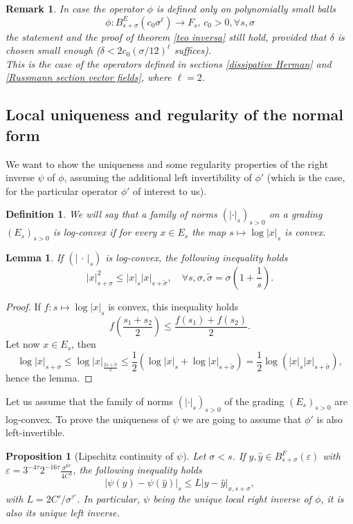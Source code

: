 \documentclass[oneside, 11pt]{amsbook}
\newcommand{\pa}[1]{{\left(#1\right)}}
\newcommand{\abs}[1]{{\left|#1\right|}}
\newcommand{\eps}{\varepsilon}
\newcommand{\0}{{(0)}}
\newcommand{\3}{{(3)}}
\newtheorem{prop}{Proposition}[section]
\newtheorem{rmk}{Remark}[section]
\newtheorem{defn}{Definition}
\newtheorem{lemma}{Lemma}
\numberwithin{equation}{section}
\numberwithin{defn}{section}
\numberwithin{prop}{section}
\numberwithin{cor}{section}
\numberwithin{lemma}{section}
\numberwithin{rmk}{section}
\numberwithin{corollary}{section}
\begin{document}
\begin{rmk}
In case the operator $\phi$ is defined only on polynomially small balls $$\phi: B^E_{s+\sigma}(c_0 \sigma^{\ell})\to F_s,\, c_0>0, \forall s,\sigma$$ the statement and the proof of theorem \ref{teo inversa} still hold, provided that $\delta$ is chosen small enough ($\delta< 2c_0(\sigma/12)^{\ell}$ suffices). \\ This is the case of the operators defined in sections \ref{dissipative Herman} and \ref{Russmann section vector fields}, where $\ell=2$. 
\label{remark polynomial}
\end{rmk}
\subsection{Local uniqueness and regularity of the normal form}
We want to show the uniqueness and some regularity properties of the right inverse $\psi$ of $\phi$, assuming the additional left invertibility of $\phi'$ (which is the case, for the particular operator $\phi'$ of interest to us).
\begin{defn}
We will say that a family of norms $(\abs{\cdot}_s)_{s>0}$ on a grading $(E_s)_{s>0}$ is \emph{log-convex} if for every $x\in E_s$ the map $ s\mapsto \log\abs{x}_s $ is convex.
\end{defn}

\begin{lemma} If $(\abs{\,\cdot\,}_s)$ is log-convex, the following inequality holds \[\abs{x}^2_{s+\sigma}\leq \abs{x}_s \abs{x}_{s+\tilde{\sigma}},\quad \forall s,\sigma,\tilde{\sigma}=\sigma(1+\frac{1}{s}).\] 
\end{lemma}

\begin{proof}
If $f: s\mapsto \log\abs{x}_s$ is convex, this inequality holds \[f\pa{\frac{s_1 + s_2}{2}}\leq \frac{f(s_1) + f(s_2)}{2}.\] Let now $x\in E_s$, then
\[\log\abs{x}_{s+\sigma}\leq\log\abs{x}_{\frac{2s + \tilde{\sigma}}{2}}\leq \frac{1}{2}\pa{\log\abs{x}_s + \log\abs{x}_{s+\tilde{\sigma}}}=\frac{1}{2}\log(\abs{x}_s\abs{x}_{s+\tilde{\sigma}}),\]hence the lemma. 
\end{proof}
Let us assume that the family of norms $(\abs{\cdot}_s)_{s>0}$ of the grading $(E_s)_{s>0}$ are log-convex. To prove the uniqueness of $\psi$ we are going to assume that $\phi'$ is also left-invertible. 

\begin{prop}[Lipschitz continuity of $\psi$] 
\label{lipschitz}
Let $\sigma<s$. If $y,\hat{y}\in B^{F}_{s+\sigma}(\eps)$ with $\eps = {3^{-4\tau}2^{-16\tau}}\frac{\sigma^{6\tau}}{4C^3}$, the following inequality holds
\[\abs{\psi(y) - \psi(\hat{y})}_s\leq L \abs{y-\hat{y}}_{x,s+\sigma},\] with $L=2C'/\sigma^{\tau'}$. In particular, $\psi$ being the unique local right inverse of $\phi$, it is also its unique left inverse.
\end{prop}
\end{document}
